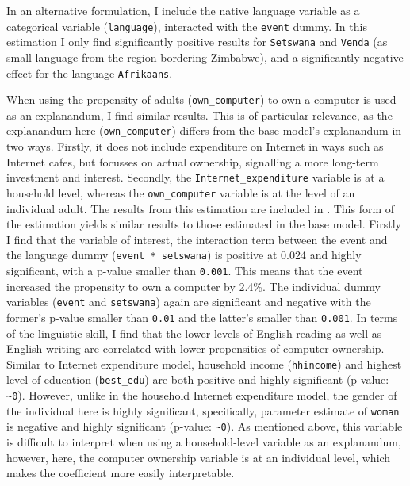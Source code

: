 \documentclass[a4paper,british]{article}\usepackage[]{graphicx}\usepackage[]{color}
\newcommand{\code}[1]{\texttt{#1}}
\begin{document}
In an alternative formulation, I include the native language variable
as a categorical variable (\code{language}), interacted with the
\code{event} dummy. In this estimation I only find significantly
positive results for \code{Setswana} and \code{Venda} (as small
language from the region bordering Zimbabwe), and a significantly
negative effect for the language \code{Afrikaans}.

When using the propensity of adults (\code{own\_computer}) to own
a computer is used as an explanandum, I find similar results. This
is of particular relevance, as the explanandum here (\code{own\_computer})
differs from the base model's explanandum in two ways. Firstly, it
does not include expenditure on Internet in ways such as Internet
cafes, but focusses on actual ownership, signalling a more long-term
investment and interest. Secondly, the \code{Internet\_expenditure}
variable is at a household level, whereas the \code{own\_computer}
variable is at the level of an individual adult. The results from
this estimation are included in . This form of
the estimation yields similar results to those estimated in the base
model. Firstly I find that the variable of interest, the interaction
term between the event and the language dummy (\code{event {*} setswana})
is positive at 0.024 and highly significant, with a p-value smaller
than \code{0.001}. This means that the event increased the propensity
to own a computer by 2.4\%. The individual dummy variables (\code{event}
and \code{setswana}) again are significant and negative with the
former's p-value smaller than \code{0.01} and the latter's smaller
than \code{0.001}. In terms of the linguistic skill, I find that
the lower levels of English reading as well as English writing are
correlated with lower propensities of computer ownership. Similar
to Internet expenditure model, household income (\code{hhincome})
and highest level of education (\code{best\_edu}) are both positive
and highly significant (p-value: \code{\textasciitilde{}0}). However,
unlike in the household Internet expenditure model, the gender of
the individual here is highly significant, specifically, parameter
estimate of \code{woman} is negative and highly significant (p-value:
\code{\textasciitilde{}0}). As mentioned above, this variable is
difficult to interpret when using a household-level variable as an
explanandum, however, here, the computer ownership variable is at
an individual level, which makes the coefficient more easily interpretable.
\end{document}
